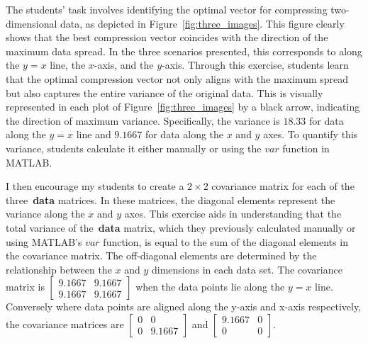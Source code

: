 \documentclass{article}
\begin{document}
The students' task involves identifying the optimal vector for compressing two-dimensional data, as depicted in Figure~\ref{fig:three_images}. 
This figure clearly shows that the best compression vector coincides with the direction of the maximum data spread. 
In the three scenarios presented, this corresponds to along the $y=x$ line, the $x$-axis, and the $y$-axis. 
Through this exercise, students learn that the optimal compression vector not only aligns with the maximum spread but also captures the entire variance of the original data. 
This is visually represented in each plot of Figure~\ref{fig:three_images} by a black arrow, indicating the direction of maximum variance. 
Specifically, the variance is $18.33$ for data along the $y=x$ line and $9.1667$ for data along the $x$ and $y$ axes. 
To quantify this variance, students calculate it either manually or using the $var$ function in MATLAB.

I then encourage my students to create a $2 \times 2$ covariance matrix for each of the three~\textbf{data} matrices. 
In these matrices, the diagonal elements represent the variance along the $x$ and $y$ axes. 
This exercise aids in understanding that the total variance of the~\textbf{data} matrix, which they previously calculated manually or using MATLAB's $var$ function, is equal to the sum of the diagonal elements in the covariance matrix.
The off-diagonal elements are determined by the relationship between the $x$ and $y$ dimensions in each data set. 
The covariance matrix is \( \begin{bmatrix} 9.1667 & 9.1667 \\ 9.1667 & 9.1667 \end{bmatrix} \) when the data points lie along the $y=x$ line. 
Conversely where data points are aligned along the y-axis and x-axis respectively, the covariance matrices are \( \begin{bmatrix} 0 & 0 \\ 0 & 9.1667 \end{bmatrix} \) and \( \begin{bmatrix} 9.1667 & 0 \\ 0 & 0 \end{bmatrix} \).
\end{document}
